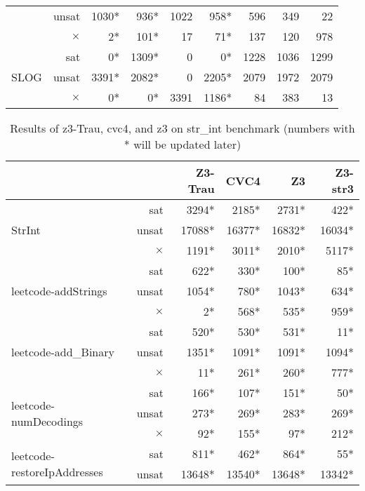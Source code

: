 \begin{table*}[t]
\begin{tabular}{l r | r r r r r r r}
							& unsat    &  1030*   &   936* &  1022 &    958*  & 596 & 349 & 22 \\
							& $\times$ &     2*   &   101* &    17 &     71*  & 137 & 120 & 978 \\ \hline
\multirow{3}{*}{SLOG}  		& sat      & 0* & 1309* & 0 & 0* & 1228 & 1036 & 1299 \\
							& unsat    & 3391* & 2082* & 0 & 2205* & 2079 & 1972 & 2079 \\
							& $\times$ & 0* & 0* & 3391 & 1186* & 84 & 383 & 13 \\ \hline
\end{tabular}
\label{table:base_benchmark}
\end{table*}

\begin{table*}[t]
\centering
\caption{Results of z3-Trau, cvc4, and z3 on str\_int benchmark (numbers with * will be updated later)}
\begin{tabular}{l r | r r r r}
\hline
\multicolumn{2}{c}{}                   & Z3-Trau & CVC4   &    Z3  & Z3-str3 \\ \hline
\multirow{3}{*}{StrInt}		& sat      &   3294*  &  2185* &  2731* &    422* \\ 
							& unsat    &  17088*  & 16377* & 16832* &  16034* \\
							& $\times$ &   1191*  &  3011* &  2010* &   5117* \\ \hline \hline
\multirow{3}{*}{leetcode-addStrings}	& sat & 622*  &  330* &  100* &  85* \\ 
							& unsat    &  1054*  & 780* & 1043* &  634* \\
							& $\times$ &  2*  &  568* &  535* & 959* \\ \hline
\multirow{3}{*}{leetcode-add\_Binary}	& sat & 520*  &  530* &  531* &  11* \\ 
							& unsat    &  1351*  & 1091* & 1091* &  1094* \\
							& $\times$ &  11*  &  261* &  260* & 777* \\ \hline
\multirow{3}{*}{leetcode-numDecodings}	& sat & 166*  &  107* &  151* &  50* \\ 
							& unsat    &  273*  & 269* & 283* &  269* \\
							& $\times$ &  92*  &  155* &  97* & 212* \\ \hline
\multirow{3}{*}{leetcode-restoreIpAddresses}	& sat & 811*  &  462* &  864* &  55* \\ 
							& unsat    &  13648*  & 13540* & 13648* &  13342* \\

\end{tabular}
\end{table*}
